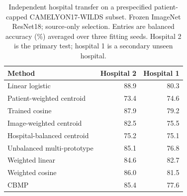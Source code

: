 \begin{table}[t]
\centering
\caption{Independent hospital transfer on a prespecified patient-capped CAMELYON17-WILDS subset. Frozen ImageNet ResNet18; source-only selection. Entries are balanced accuracy (\%) averaged over three fitting seeds. Hospital 2 is the primary test; hospital 1 is a secondary unseen hospital.}
\label{tab:camelyon_transfer}
\begin{tabular}{lrr}
\hline
Method & Hospital 2 & Hospital 1 \\
\hline
Linear logistic & 88.9 & 80.3 \\
Patient-weighted centroid & 73.4 & 74.6 \\
Trained cosine & 87.9 & 79.2 \\
Image-weighted centroid & 82.5 & 75.5 \\
Hospital-balanced centroid & 75.2 & 75.1 \\
Unbalanced multi-prototype & 85.1 & 76.8 \\
Weighted linear & 84.6 & 82.7 \\
Weighted cosine & 86.0 & 81.5 \\
CBMP & 85.4 & 77.6 \\
\hline
\end{tabular}
\end{table}
